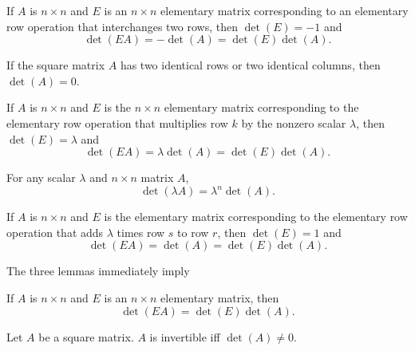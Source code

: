 \begin{lemma}
  If $A$ is $n \times n$ and $E$ is an $n \times n$ elementary matrix corresponding to an elementary row operation that interchanges two rows, then $\det(E) = -1$ and
  \begin{equation*}
    \det(EA) = -\det(A) = \det(E)\det(A).
  \end{equation*}
\end{lemma}

\begin{corollary}
  If the square matrix $A$ has two identical rows or two identical columns, then $\det(A) = 0$.
\end{corollary}

\begin{lemma}
  If $A$ is $n \times n$ and $E$ is the $n \times n$ elementary matrix corresponding to the elementary row operation that multiplies row $k$ by the nonzero scalar $\lambda$,
  then $\det(E) = \lambda$ and
  \begin{equation*}
    \det(EA) = \lambda \det(A) = \det(E) \det(A).
  \end{equation*}
\end{lemma}

\begin{corollary}
  For any scalar $\lambda$ and $n \times n$ matrix $A$,
  \begin{equation*}
    \det(\lambda A) = \lambda^{n} \det(A).
  \end{equation*}
\end{corollary}

\begin{lemma}
  If $A$ is $n \times n$ and $E$ is the elementary matrix corresponding to the elementary row operation that adds $\lambda$ times  row $s$  to row $r$, then $\det(E) = 1$ and
  \begin{equation*}
    \det(EA) = \det(A) = \det(E)\det(A).
  \end{equation*}
\end{lemma}

The three lemmas immediately imply
\begin{theorem}
  If $A$ is $n \times n$ and $E$ is an $n \times n$ elementary matrix, then
  \begin{equation*}
    \det(EA) = \det(E)\det(A).
  \end{equation*}
\end{theorem}

\begin{theorem}
  Let $A$ be a square matrix. $A$ is invertible iff $\det(A) \neq 0$.
\end{theorem}

